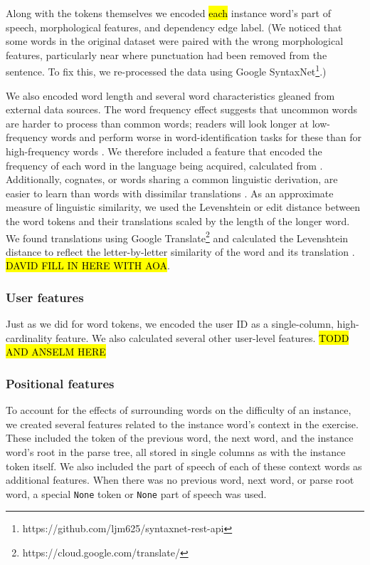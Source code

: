 \documentclass[11pt,a4paper]{article}
\begin{document}
Along with the tokens themselves we encoded \hl{each} instance word's part of speech,
morphological features, and dependency edge label. (We noticed that some words
in the original dataset were paired with the wrong morphological features,
particularly near where punctuation had been removed from the sentence. To fix
this, we re-processed the data using Google SyntaxNet\footnote{https://github.com/ljm625/syntaxnet-rest-api}.)

We also encoded word length and several word characteristics gleaned from
external data sources. The word frequency effect suggests that uncommon words are harder to process than common words; readers will look longer at low-frequency words and perform worse in word-identification tasks for these than for high-frequency words \cite{rayner1998eye}. We therefore included a feature that encoded the frequency of each word in the language being acquired, calculated from \citet{robert_speer_2017_998161}. Additionally, cognates, or words sharing a common linguistic derivation, are easier to learn than words with dissimilar translations \cite{de2000hard}. As an approximate measure of linguistic similarity, we used the Levenshtein or edit distance between the word tokens and their translations scaled by the length of the longer word. We found translations using Google Translate\footnote{https://cloud.google.com/translate/} and calculated the Levenshtein distance to reflect the letter-by-letter similarity of the word and its translation \cite{hyyro2001explaining}. \hl{DAVID FILL IN HERE WITH AOA}. 

\subsubsection{User features}

Just as we did for word tokens, we encoded the user ID as a single-column,
high-cardinality feature. We also calculated several other user-level features.
\hl{TODD AND ANSELM HERE}

\subsubsection{Positional features}

To account for the effects of surrounding words on the difficulty of an
instance, we created several features related to the instance word's context in
the exercise. These included the token of the previous word, the next word, and
the instance word's root in the parse tree, all stored in single columns as with
the instance token itself. We also included the part of speech of each of these
context words as additional features. When there was no previous word, next word, or parse
root word, a special {\tt None} token or {\tt None} part of speech was used.
\end{document}
